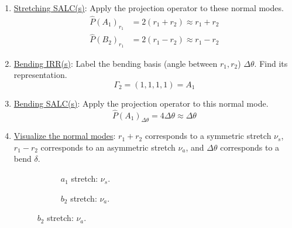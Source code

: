 \documentclass[../notes.tex]{subfiles}
\begin{document}
\begin{itemize}
\begin{enumerate}
\begin{enumerate}
            \item \underline{Stretching SALC(s)}: Apply the projection operator to these normal modes.
            \begin{align*}
                \hat{P}(A_1)_{r_1} &= 2(r_1+r_2) \approx r_1+r_2\\
                \hat{P}(B_2)_{r_1} &= 2(r_1-r_2) \approx r_1-r_2
            \end{align*}
            \item \underline{Bending IRR(s)}: Label the bending basis (angle between $r_1,r_2$) $\Delta\theta$. Find its representation.
            \begin{equation*}
                \Gamma_2 = (1,1,1,1)
                = A_1
            \end{equation*}
            \item \underline{Bending SALC(s)}: Apply the projection operator to this normal mode.
            \begin{equation*}
                \hat{P}(A_1)_{\Delta\theta} = 4\Delta\theta \approx \Delta\theta
            \end{equation*}
            \item \underline{Visualize the normal modes}: $r_1+r_2$ corresponds to a symmetric stretch $\nu_s$, $r_1-r_2$ corresponds to an asymmetric stretch $\nu_a$, and $\Delta\theta$ corresponds to a bend $\delta$.
            \begin{figure}[h!]
                \centering
                \footnotesize
                \begin{subfigure}[b]{0.2\linewidth}
                    \centering
                    \caption{$a_1$ stretch: $\nu_s$.}
                    \label{fig:H2Ovibsa}
                \end{subfigure}
                \begin{subfigure}[b]{0.2\linewidth}
                    \centering
                    \caption{$b_2$ stretch: $\nu_a$.}

\end{subfigure}
\end{figure}
\end{enumerate}
\end{enumerate}
\end{itemize}
\end{document}

